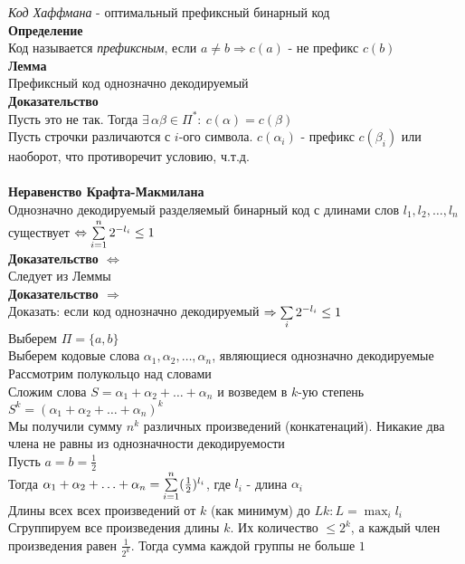\documentclass[12pt]{article}
\begin{document}
\textit{Код Хаффмана} - оптимальный префиксный бинарный код\\
\textbf{Определение}\\
Код называется \textit{префиксным}, если $a \neq b \Rightarrow c(a)$ - не префикс $c(b)$\\
\textbf{Лемма}\\
Префиксный код однозначно декодируемый\\
\textbf{Доказательство}\\
Пусть это не так.
Тогда $\exists\,\alpha\beta\in \Pi^*:\ c(\alpha)=c(\beta)$\\
Пусть строчки различаются с $i$-ого символа. $c(\alpha_i)$ - префикс $c(\beta_i)$ или наоборот, что противоречит условию, ч.т.д.\\\\
\textbf{Неравенство Крафта-Макмилана}\\
Однозначно декодируемый разделяемый бинарный код с длинами слов $l_1,l_2,\ldots,l_n$ существует $\Leftrightarrow \sum\limits_{i=1}^n 2^{-l_i} \leq 1$\\
\textbf{Доказательство $\Leftrightarrow$}\\
Следует из Леммы\\
\textbf{Доказательство $\Rightarrow$}\\
Доказать: если код однозначно декодируемый $\Rightarrow \sum\limits_{i}2^{-l_i} \leq 1$\\
Выберем $\Pi = \{a,b\}$\\
Выберем кодовые слова $\alpha_1, \alpha_2,\ldots,\alpha_n$, являющиеся однозначно декодируемые\\
Рассмотрим полукольцо над словами\\
Сложим слова $S=\alpha_1+\alpha_2+\ldots+\alpha_n$ и возведем в $k$-ую степень\\
$S^k=(\alpha_1+\alpha_2+\ldots+\alpha_n)^k$\\
Мы получили сумму $n^k$ различных произведений (конкатенаций). Никакие два члена не равны из однозначности декодируемости\\
Пусть $a=b=\frac12$\\
Тогда $\alpha_1+\alpha_2+\ldots+\alpha_n = \sum\limits_{i=1}^n (\frac12)^{l_i}$, где $l_i$ - длина $\alpha_i$\\
Длины всех всех произведений от $k$ (как минимум) до $Lk: L = \max_i l_i$\\
Сгруппируем все произведения длины $k$. Их количество $\leq 2^k$, а каждый член произведения равен $\frac1{2^k}$. Тогда сумма каждой группы не больше $1$\\
\end{document}
